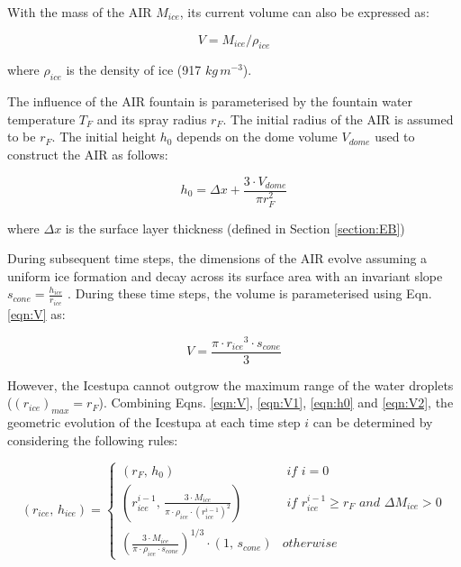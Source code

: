 \documentclass[utf8]{frontiersSCNS} %
\begin{document}
With the mass of the AIR $M_{ice}$, its current volume can also be expressed as:

\begin{equation} V = M_{ice} /\rho_{ice} \label{eqn:V1} \end{equation}

where $\rho_{ice}$ is the density of ice (917 $kg\, m^{-3}$).


The influence of the AIR fountain is parameterised by the fountain water temperature $T_{F}$ and its spray radius $r_F$.
The initial radius of the AIR is assumed to be $r_F$. The initial height $h_0$ depends on the dome volume $V_{dome}$
used to construct the AIR as follows:

\begin{equation}
	h_{0} =  \Delta x + \frac{3 \cdot V_{dome}}{\pi r_F^2 }
	\label{eqn:h0}
\end{equation}

where $\Delta x$ is the surface layer thickness (defined in Section \ref{section:EB})

During subsequent time steps, the dimensions of the AIR evolve assuming a uniform ice formation and decay across its
surface area with an invariant slope $s_{cone} = \frac{h_{ice}}{r_{ice}}$ .  During these time steps, the volume is
parameterised using Eqn. \ref{eqn:V} as:

\begin{equation} V = \frac{\pi \cdot {r_{ice}}^3
		\cdot s_{cone}}{3} \label{eqn:V2} \end{equation}


However, the Icestupa cannot outgrow the maximum range of the water droplets ($(r_{ice})_{max} = r_{F}$). Combining
Eqns. \ref{eqn:V},  \ref{eqn:V1}, \ref{eqn:h0} and \ref{eqn:V2}, the geometric evolution of the Icestupa at each time
step $i$ can be determined by considering the following rules:

\begin{equation} (r_{ice},\, h_{ice}) = \left\{ \begin{array}{ll} (r_F ,\, h_0)                                                                        & \textit{ if } i=0 \\
             (r_{ice}^{i-1},\, \frac{3 \cdot M_{ice}}{\pi \cdot \rho_{ice} \cdot {(r_{ice}^{i-1})}^2}) & \textit{ if }
             r_{ice}^{i-1} \geq r_{F} \textit{ and } \Delta M_{ice} > 0                                                    \\ (\frac{3 \cdot M_{ice}}{\pi \cdot \rho_{ice} \cdot s_{cone}})^{1/3} \cdot (1,\,  s_{cone}) &
             otherwise\end{array} \right.  \label{eqn:A2} \end{equation}
\end{document}
